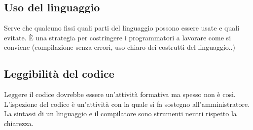 \subsection{Uso del linguaggio}
Serve che qualcuno fissi quali parti del linguaggio possono essere usate e quali evitate. \`E una strategia per costringere i programmatori a lavorare come si conviene (compilazione senza errori, uso chiaro dei costrutti del linguaggio..)
\subsection{Leggibilità del codice}
Leggere il codice dovrebbe essere un'attività formativa ma spesso non è così. L'ispezione del codice è un'attività con la quale si fa sostegno all'amministratore. La sintassi di un linguaggio e il compilatore sono strumenti neutri rispetto la chiarezza.